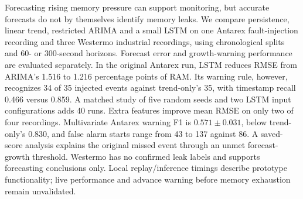 Forecasting rising memory pressure can support monitoring, but accurate forecasts do not by themselves identify memory leaks. We compare persistence, linear trend, restricted ARIMA and a small LSTM on one Antarex fault-injection recording and three Westermo industrial recordings, using chronological splits and 60- or 300-second horizons. Forecast error and growth-warning performance are evaluated separately. In the original Antarex run, LSTM reduces RMSE from ARIMA's 1.516 to 1.216 percentage points of RAM. Its warning rule, however, recognizes 34 of 35 injected events against trend-only's 35, with timestamp recall 0.466 versus 0.859. A matched study of five random seeds and two LSTM input configurations adds 40 runs. Extra features improve mean RMSE on only two of four recordings. Multivariate Antarex warning F1 is $0.571\pm0.031$, below trend-only's 0.830, and false alarm starts range from 43 to 137 against 86. A saved-score analysis explains the original missed event through an unmet forecast-growth threshold. Westermo has no confirmed leak labels and supports forecasting conclusions only. Local replay/inference timings describe prototype functionality; live performance and advance warning before memory exhaustion remain unvalidated.

